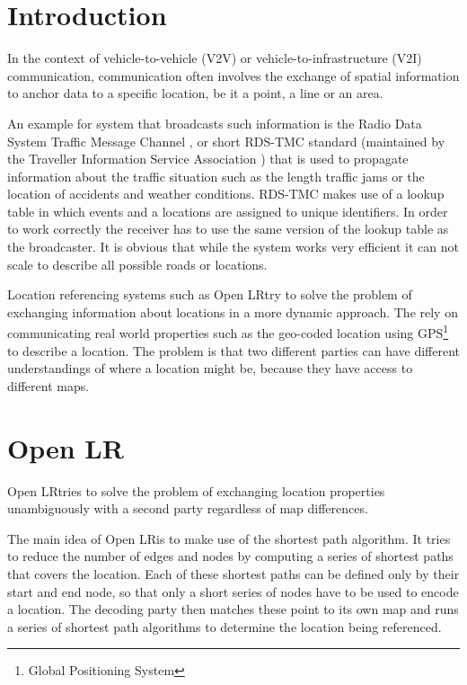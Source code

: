 \section{Introduction}
\label{sec:introduction}

In the context of vehicle-to-vehicle (V2V) or vehicle-to-infrastructure (V2I) communication, communication often involves the exchange of spatial information to anchor data to a specific location, be it a point, a line or an area.

An example for system that broadcasts such information is the Radio Data System Traffic Message Channel , or short RDS-TMC \cite{tmc} standard (maintained by the Traveller Information Service Association \cite{TISA}) that is used to propagate information about the traffic situation such as the length traffic jams or the location of accidents and weather conditions. RDS-TMC makes use of a lookup table in which events and a locations are assigned to unique identifiers. In order to work correctly the receiver has to use the same version of the lookup table as the broadcaster. It is obvious that while the system works very efficient it can not scale to describe all possible roads or locations. 

Location referencing systems such as Open LR\tm try to solve the problem of exchanging information about locations in a more dynamic approach. The rely on communicating real world properties such as the geo-coded location using GPS\footnote{Global Positioning System} to describe a location. The problem is that two different parties can have different understandings of where a location might be, because they have access to different maps.

\section{Open LR\tm}
\label{sec:open_lr}

Open LR\tm tries to solve the problem of exchanging location properties unambiguously with a second party regardless of map differences. 


The main idea of Open LR\tm is to make use of the shortest path algorithm. It tries to reduce the number of edges and nodes by computing a series of shortest paths that covers the location. Each of these shortest paths can be defined only by their start and end node, so that only a short series of nodes have to be used to encode a location. The decoding party then matches these point to its own map and runs a series of shortest path algorithms to determine the location being referenced.

